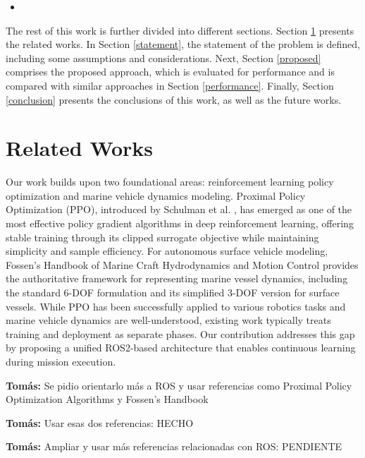 \documentclass[preprint,3p]{elsarticle}
\newcommand{\tcom}[1]{{ \color{blue}\textbf{Tomás:} #1}}
\begin{document}
\begin{itemize}
    \item 
\end{itemize}

The rest of this work is further divided into different sections. Section \ref{related} presents the related works. In Section \ref{statement}, the statement of the problem is defined, including some assumptions and considerations. Next, Section \ref{proposed} comprises the proposed approach, which is evaluated for performance and is compared with similar approaches in Section \ref{performance}. Finally, Section \ref{conclusion} presents the conclusions of this work, as well as the future works. 

\section{Related Works}
\label{related}

Our work builds upon two foundational areas: reinforcement learning policy optimization and marine vehicle dynamics modeling. Proximal Policy Optimization (PPO), introduced by Schulman et al. \cite{schulman2017proximalpolicyoptimizationalgorithms}, has emerged as one of the most effective policy gradient algorithms in deep reinforcement learning, offering stable training through its clipped surrogate objective while maintaining simplicity and sample efficiency. For autonomous surface vehicle modeling, Fossen's Handbook of Marine Craft Hydrodynamics and Motion Control \cite{fossen2011handbook} provides the authoritative framework for representing marine vessel dynamics, including the standard 6-DOF formulation and its simplified 3-DOF version for surface vessels. While PPO has been successfully applied to various robotics tasks and marine vehicle dynamics are well-understood, existing work typically treats training and deployment as separate phases. Our contribution addresses this gap by proposing a unified ROS2-based architecture that enables continuous learning during mission execution.

\vspace{0.5em}

\tcom{Se pidio orientarlo más a ROS y usar referencias como Proximal Policy Optimization Algorithms y  Fossen’s Handbook}

\tcom{Usar esas dos referencias: HECHO}

\tcom{Ampliar y usar más referencias relacionadas con ROS: PENDIENTE}
\end{document}

